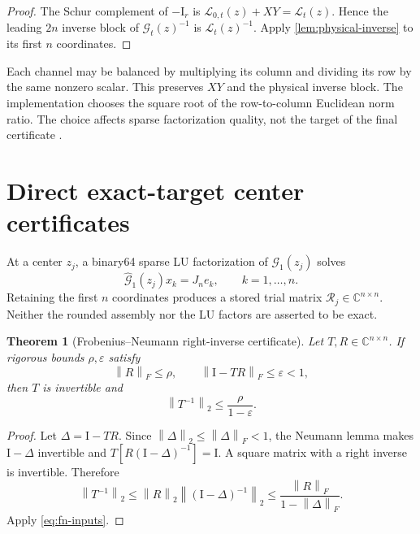\documentclass[11pt]{article}
\newtheorem{theorem}{Theorem}[section]
\theoremstyle{definition}
\theoremstyle{remark}
\newcommand{\C}{\mathbb C}
\newcommand{\Id}{\mathrm I}
\newcommand{\norm}[1]{\left\lVert#1\right\rVert}
\newcommand{\Rapp}{\mathcal R}
\newcommand{\Gmat}{\mathcal G}
\newcommand{\Lmat}{\mathcal L}
\begin{document}
\begin{proof}
The Schur complement of $-\Id_r$ is
$\Lmat_{0,t}(z)+XY=\Lmat_t(z)$.  Hence the leading $2n$ inverse block of
$\Gmat_t(z)^{-1}$ is $\Lmat_t(z)^{-1}$.  Apply
\cref{lem:physical-inverse} to its first $n$ coordinates.
\end{proof}

Each channel may be balanced by multiplying its column and dividing its row
by the same nonzero scalar.  This preserves $XY$ and the physical inverse
block.  The implementation chooses the square root of the row-to-column
Euclidean norm ratio.  The choice affects sparse factorization quality, not
the target of the final certificate \citep{Davis2006,WangSparseGrushin2026}.

\section{Direct exact-target center certificates}
\label{sec:center-certificates}

At a center $z_j$, a binary64 sparse LU factorization of
$\Gmat_1(z_j)$ solves
\begin{equation}
 \widehat{\Gmat}_1(z_j)x_k=J_ne_k,\qquad k=1,\ldots,n.
 \label{eq:trial-solves}
\end{equation}
Retaining the first $n$ coordinates produces a stored trial matrix
$\Rapp_j\in\C^{n\times n}$.  Neither the rounded assembly nor the LU factors
are asserted to be exact.

\begin{theorem}[Frobenius--Neumann right-inverse certificate]
\label{thm:frobenius-neumann}
Let $T,R\in\C^{n\times n}$.  If rigorous bounds $\rho,\varepsilon$ satisfy
\begin{equation}
 \norm{R}_F\leq\rho,\qquad
 \norm{\Id-TR}_F\leq\varepsilon<1,
 \label{eq:fn-inputs}
\end{equation}
then $T$ is invertible and
\begin{equation}
 \norm{T^{-1}}_2\leq\frac{\rho}{1-\varepsilon}.
 \label{eq:fn-bound}
\end{equation}
\end{theorem}

\begin{proof}
Let $\Delta=\Id-TR$.  Since
$\norm{\Delta}_2\leq\norm{\Delta}_F<1$, the Neumann lemma makes
$\Id-\Delta$ invertible and $T[R(\Id-\Delta)^{-1}]=\Id$.  A square matrix
with a right inverse is invertible.  Therefore
\[
 \norm{T^{-1}}_2
 \leq\norm{R}_2\norm{(\Id-\Delta)^{-1}}_2
 \leq\frac{\norm{R}_F}{1-\norm{\Delta}_F}.
\]
Apply \cref{eq:fn-inputs}.
\end{proof}
\end{document}
